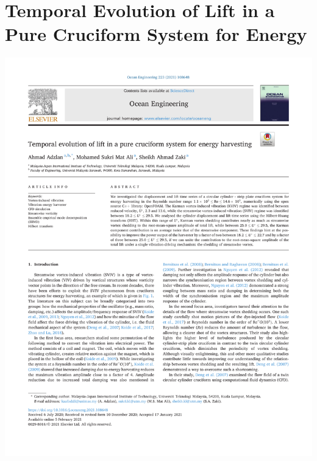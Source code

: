\documentclass[oneside]{utmthesis}
\begin{document}
\chapter{Temporal Evolution of Lift in a Pure Cruciform System for Energy}
\begin{center}
  \includegraphics[width=1\textwidth]{figs/appendix_WoS}
\end{center}
\end{document}
